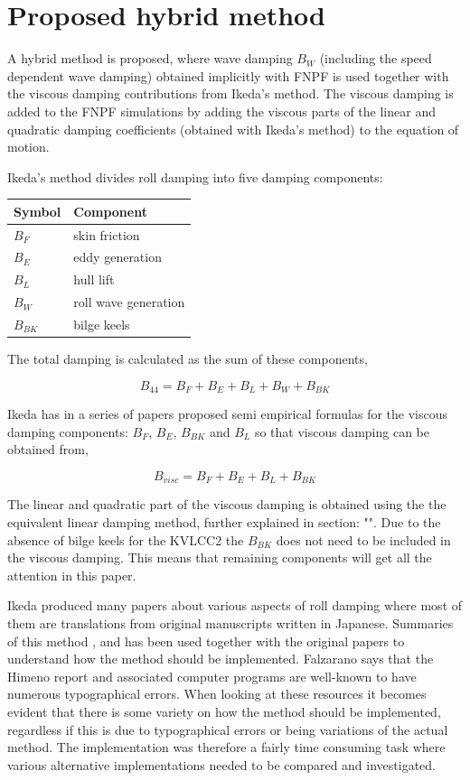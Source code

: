 \section{Proposed hybrid method}\label{proposed-hybrid-method}

A hybrid method is proposed, where wave damping $B_W$ (including the
speed dependent wave damping) obtained implicitly with FNPF is used
together with the viscous damping contributions from Ikeda's method. The
viscous damping is added to the FNPF simulations by adding the viscous
parts of the linear and quadratic damping coefficients (obtained with
Ikeda's method) to the equation of motion.

Ikeda's method divides roll damping into five damping components:

\begin{longtable}[]{@{}ll@{}}
\toprule
Symbol & Component\tabularnewline
\midrule
\endhead
$B_F$ & skin friction\tabularnewline
$B_E$ & eddy generation\tabularnewline
$B_L$ & hull lift\tabularnewline
$B_W$ & roll wave generation\tabularnewline
$B_{BK}$ & bilge keels\tabularnewline
\bottomrule
\end{longtable}

The total damping is calculated as the sum of these components,

\begin{equation}
B_{44} = B_F + B_E + B_L + B_W + B_{BK}
\end{equation}

Ikeda has in a series of papers proposed semi empirical formulas for the
viscous damping components: $B_F$, $B_E$, $B_{BK}$ and $B_L$ so
that viscous damping can be obtained from,

\begin{equation}
\label{eq:viscous damping}
B_{visc} = B_F + B_E + B_L + B_{BK}
\end{equation}

The linear and quadratic part of the viscous damping is obtained using
the the equivalent linear damping method, further explained in section:
"". Due to the absence of bilge keels
for the KVLCC2 the $B_{BK}$ does not need to be included in the
viscous damping. This means that remaining components will get all the
attention in this paper.

Ikeda produced many papers about various aspects of roll damping where
most of them are translations from original manuscripts written in
Japanese. Summaries of this method \cite{7505983/FB64RGPF},
\cite{7505983/KAKIM2E2} and \cite{7505983/UGK6YEVD} has been used
together with the original papers to understand how the method should be
implemented. Falzarano says that the Himeno report and associated
computer programs are well-known to have numerous typographical errors.
When looking at these resources it becomes evident that there is some
variety on how the method should be implemented, regardless if this is
due to typographical errors or being variations of the actual method.
The implementation was therefore a fairly time consuming task where
various alternative implementations needed to be compared and
investigated.


